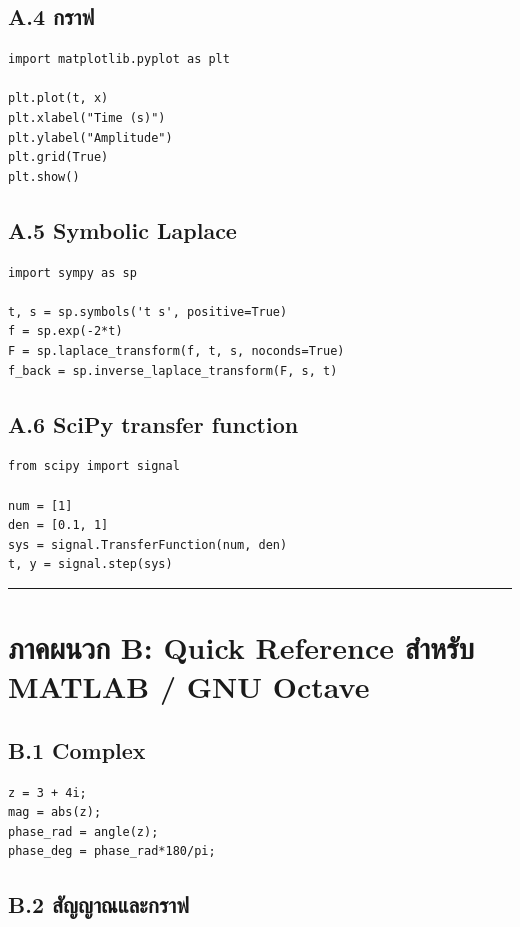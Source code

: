 \subsection{A.4 กราฟ}

\begin{verbatim}
import matplotlib.pyplot as plt

plt.plot(t, x)
plt.xlabel("Time (s)")
plt.ylabel("Amplitude")
plt.grid(True)
plt.show()
\end{verbatim}

\subsection{A.5 Symbolic Laplace}

\begin{verbatim}
import sympy as sp

t, s = sp.symbols('t s', positive=True)
f = sp.exp(-2*t)
F = sp.laplace_transform(f, t, s, noconds=True)
f_back = sp.inverse_laplace_transform(F, s, t)
\end{verbatim}

\subsection{A.6 SciPy transfer function}

\begin{verbatim}
from scipy import signal

num = [1]
den = [0.1, 1]
sys = signal.TransferFunction(num, den)
t, y = signal.step(sys)
\end{verbatim}

\par\noindent\rule{\textwidth}{0.4pt}\par

\section{ภาคผนวก B: Quick Reference สำหรับ MATLAB / GNU Octave}

\subsection{B.1 Complex}

\begin{verbatim}
z = 3 + 4i;
mag = abs(z);
phase_rad = angle(z);
phase_deg = phase_rad*180/pi;
\end{verbatim}

\subsection{B.2 สัญญาณและกราฟ}

